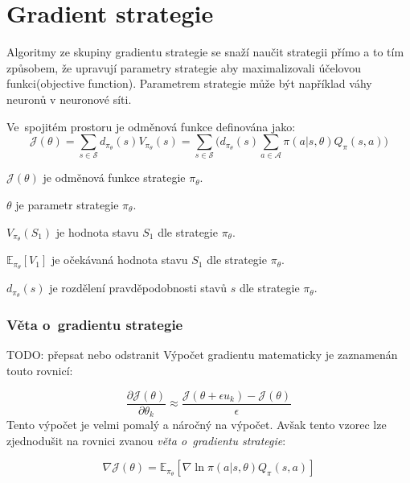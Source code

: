 \section{Gradient strategie}\label{subsec:gradient-strategie}
Algoritmy ze skupiny gradientu strategie se snaží naučit strategii přímo a to tím způsobem, že upravují parametry strategie aby maximalizovali účelovou funkci(objective function).
Parametrem strategie může být například váhy neuronů v neuronové síti.

Ve~spojitém prostoru je odměnová funkce definována jako:
\begin{equation}
    \label{eq:ucelova_funkce_spojita}
  \mathcal{J}(\theta) = \sum_{s \in \mathcal{S}} d_{\pi_\theta}(s) V_{\pi_\theta}(s) = \sum_{s \in \mathcal{S}} \Big( d_{\pi_\theta}(s) \sum_{a \in \mathcal{A}} \pi(a \vert s, \theta) Q_\pi(s, a) \Big)
  \end{equation}

\begin{myitemize}
  \item $\mathcal{J}(\theta)$ je odměnová funkce strategie $\pi_\theta$.
  \item $\theta$ je parametr strategie $\pi_\theta$.
  \item $V_{\pi_\theta}(S_1)$ je hodnota stavu $S_1$ dle strategie $\pi_\theta$.
  \item $\mathbb{E}_{\pi_\theta}[V_1]$ je očekávaná hodnota stavu $S_1$ dle strategie $\pi_\theta$.
  \item $d_{\pi_\theta}(s)$ je rozdělení pravděpodobnosti stavů $s$ dle strategie $\pi_\theta$.
\end{myitemize}

\subsubsection*{Věta o~gradientu strategie}
{\color{red}TODO: přepsat nebo odstranit}
Výpočet gradientu matematicky je zaznamenán touto rovnicí:

\begin{equation}
  \label{eq:gradient_strategie}
  \frac{\partial \mathcal{J}(\theta)}{\partial \theta_k} \approx \frac{\mathcal{J}(\theta + \epsilon u_k) - \mathcal{J}(\theta)}{\epsilon}
\end{equation}
Tento výpočet je velmi pomalý a náročný na výpočet.
Avšak tento vzorec lze zjednodušit na rovnici zvanou \emph{věta o~gradientu strategie}:

\begin{equation}
    \label{eq:veta_o_gradientu_strategie}
  \nabla \mathcal{J}(\theta) = \mathbb{E}_{\pi_\theta} [\nabla \ln \pi(a \vert s, \theta) Q_\pi(s, a)]
\end{equation}


